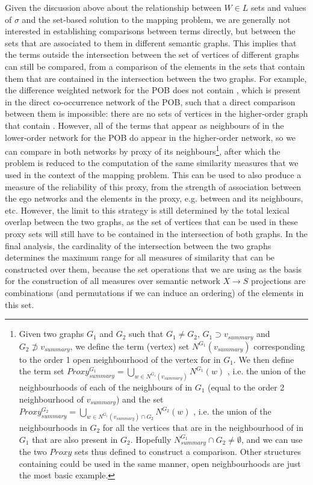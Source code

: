 Given the discussion above about the relationship between $W \in L$ sets and values of $\sigma$ and the set-based solution to the mapping problem, we are generally not interested in establishing comparisons between terms directly, but between the sets that are associated to them in different semantic graphs.
This implies that the terms outside the intersection between the set of vertices of different graphs can still be compared, from a comparison of the elements in the sets that contain them that are contained in the intersection between the two graphs.
For example, the difference weighted network for the POB does not contain , which is present in the direct co-occurrence network of the POB, such that a direct comparison between them is impossible: there are no sets of vertices in the higher-order graph that contain .
However, all of the terms that appear as neighbours of  in the lower-order network for the POB do appear in the higher-order network, so we can compare  in both networks by proxy of its neighbours\footnote{
    Given two graphs $G_1$ and $G_2$ such that $G_1 \ne G_2$, $G_1 \supset v_{summary}$ and $G_2 \not\supset v_{summary}$,
    we define the term (vertex) set
    $N^{G_1}(v_{summary})$
    corresponding to the order 1 open neighbourhood of the vertex for  in $G_1$.
    We then define the term set
    $Proxy_{summary}^{G_1} = \bigcup_{ w \in N^{G_1}(v_{summary}) }N^{G_1}(w)$
    , i.e. the union of the neighbourhoods of each of the neighbours of  in $G_1$ (equal to the order 2 neighbourhood of $v_{summary}$) and the set
    $Proxy_{summary}^{G_2} = \bigcup_{ w \in N^{G_1}(v_{summary}) \cap G_2 } N^{G_2}(w)$
    , i.e. the union of the neighbourhoods in $G_2$ for all the vertices that are in the neighbourhood of  in $G_1$ that are also present in $G_2$.
    Hopefully $N_{summary}^{G_1} \cap G_2 \ne \emptyset$, and we can use the two $Proxy$ sets thus defined to construct a comparison.
    Other structures containing  could be used in the same manner, open neighbourhoods are just the most basic example.
},
after which the problem is reduced to the computation of the same similarity measures that we used in the context of the mapping problem.
This can be used to also produce a measure of the reliability of this proxy, from the strength of association between the ego networks and the elements in the proxy, e.g. between  and its neighbours, etc.
However, the limit to this strategy is still determined by the total lexical overlap between the two graphs, as the set of vertices that can be used in these proxy sets will still have to be contained in the intersection of both graphs.
In the final analysis, the cardinality of the intersection between the two graphs determines the maximum range for all measures of similarity that can be constructed over them, because the set operations that we are using as the basis for the construction of all measures over semantic network $X \rightarrow S$ projections are combinations (and permutations if we can induce an ordering) of the elements in this set.

